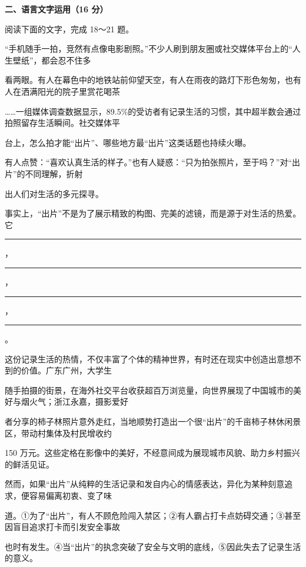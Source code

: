 \documentclass[UTF8,a4paper,fontset=fandol]{ctexart}
\begin{document}
\vspace{0.35em}\par
\vspace{0.35em}\par
\vspace{0.25em}\textbf{二、语言文字运用（16 分）}\par
阅读下面的文字，完成 18～21 题。\par
\hspace*{1.8em}“手机随手一拍，竞然有点像电影剧照。”不少人刷到朋友圈或社交媒体平台上的“人生壁纸”，都会忍不住多\par
看两眼。有人在幕色中的地铁站前仰望天空，有人在雨夜的路灯下形色匆匆，也有人在洒满阳光的院子里赏花喝茶\par
……一组媒体调查数据显示，89.5\%的受访者有记录生活的习惯，其中超半数会通过拍照留存生活瞬间。社交媒体平\par
台上，怎么拍才能“出片”、哪些地方最“出片”这类话题也持续火曝。\par
\hspace*{1.8em}有人点赞：“喜欢认真生活的样子。”也有人疑惑：“只为拍张照片，至于吗？”对“出片”的不同理解，折射\par
出人们对生活的多元探寻。\par
    事实上，“出片”不是为了展示精致的构图、完美的滤镜，而是源于对生活的热爱。它\rule{0.080\linewidth}{0.35pt}，\rule{0.080\linewidth}{0.35pt}，\rule{0.080\linewidth}{0.35pt}\par
，\rule{0.080\linewidth}{0.35pt}。\par
\hspace*{1.8em}这份记录生活的热情，不仅丰富了个体的精神世界，有时还在现实中创造出意想不到的价值。广东广州，大学生\par
随手拍摄的街景，在海外社交平台收获超百万浏览量，向世界展现了中国城市的美好与烟火气；浙江永嘉，摄影爱好\par
者分享的柿子林照片意外走红，当地顺势打造出一个很“出片”的千亩柿子林休闲景区，带动村集体及村民增收约\par
150 万元。这些定格在影像中的美好，不经意间成为展现城市风貌、助力乡村振兴的鲜活见证。\par
\hspace*{1.8em}然而，如果“出片”从纯粹的生活记录和发自内心的情感表达，异化为某种刻意追求，便容易偏离初衷、变了味\par
道。①为了“出片”，有人不顾危险闯入禁区；②有人霸占打卡点妨碍交通；③甚至因盲目追求打卡而引发安全事故\par
也时有发生。④当“出片”的执念突破了安全与文明的底线，⑤因此失去了记录生活的意义。\par
\end{document}
